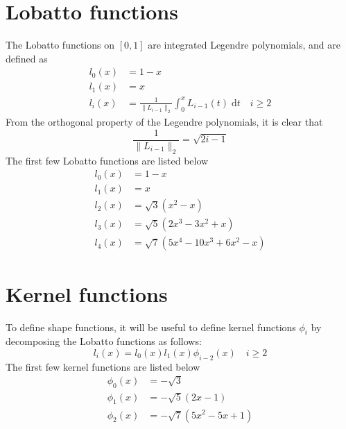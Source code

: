 \documentclass{article}
\begin{document}
\section{Lobatto functions}

The Lobatto functions on $[0,1]$ are integrated Legendre polynomials, and
are defined as
\begin{align*}
l_0(x) &= 1-x \\
l_1(x) &= x \\
l_i(x) & = \frac{1}{ \| L_{i-1} \|_2}
\int _0 ^x L_{i-1}(t) \; \text{d}t \quad i \geq 2
\end{align*}
From the orthogonal property of the Legendre polynomials, it is clear that
\[
\frac{1}{ \| L_{i-1} \|_2} = \sqrt{2i - 1}
\]
The first few Lobatto functions are listed below
\begin{align*}
l_0(x) &= 1-x \\
l_1(x) &= x \\
l_2(x) &= \sqrt{3} (x^2 - x) \\
l_3(x) &= \sqrt{5} (2x^3 - 3x^2 + x) \\
l_4(x) &= \sqrt{7} (5x^4 - 10x^3 + 6x^2 - x)
\end{align*}

\section{Kernel functions}

To define shape functions, it will be useful to define kernel functions
$\phi_i$ by decomposing the Lobatto functions as follows:
\[
l_i(x) = l_0(x) l_1(x) \phi_{i-2}(x) \quad i \geq 2
\]
The first few kernel functions are listed below
\begin{align*}
\phi_0(x) &= -\sqrt{3} \\
\phi_1(x) &= -\sqrt{5} (2x - 1) \\
\phi_2(x) &= -\sqrt{7} (5x^2 - 5x + 1)
\end{align*}
\end{document}
